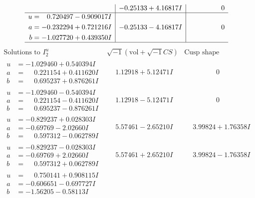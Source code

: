 \documentclass[1p]{elsarticle_modified}
\theoremstyle{definition}
\newcommand{\I}{\sqrt{-1}}
\begin{document}
$$\begin{array}{c|c|c}
 & -0.25133 + 4.16817 I & \phantom{-0.000000 } 0 \\ \hline\begin{aligned}
u &= \phantom{-}0.720497 - 0.909017 I \\
a &= -0.232294 + 0.721216 I \\
b &= -1.027720 + 0.439350 I\end{aligned}
 & -0.25133 - 4.16817 I & \phantom{-0.000000 } 0\\
 \hline 
 \end{array}$$\newpage$$\begin{array}{c|c|c}  
\text{Solutions to }I^u_{2}& \I (\text{vol} + \sqrt{-1}CS) & \text{Cusp shape}\\
 \hline 
\begin{aligned}
u &= -1.029460 + 0.540394 I \\
a &= \phantom{-}0.221154 + 0.411620 I \\
b &= \phantom{-}0.695237 + 0.876261 I\end{aligned}
 & \phantom{-}1.12918 + 5.12471 I & \phantom{-0.000000 } 0 \\ \hline\begin{aligned}
u &= -1.029460 - 0.540394 I \\
a &= \phantom{-}0.221154 - 0.411620 I \\
b &= \phantom{-}0.695237 - 0.876261 I\end{aligned}
 & \phantom{-}1.12918 - 5.12471 I & \phantom{-0.000000 } 0 \\ \hline\begin{aligned}
u &= -0.829237 + 0.028303 I \\
a &= -0.69769 - 2.02660 I \\
b &= \phantom{-}0.597312 - 0.062789 I\end{aligned}
 & \phantom{-}5.57461 - 2.65210 I & \phantom{-}3.99824 + 1.76358 I \\ \hline\begin{aligned}
u &= -0.829237 - 0.028303 I \\
a &= -0.69769 + 2.02660 I \\
b &= \phantom{-}0.597312 + 0.062789 I\end{aligned}
 & \phantom{-}5.57461 + 2.65210 I & \phantom{-}3.99824 - 1.76358 I \\ \hline\begin{aligned}
u &= \phantom{-}0.750141 + 0.908115 I \\
a &= -0.606651 - 0.697727 I \\
b &= -1.56205 - 0.58113 I\end{aligned}

\end{array}$$
\end{document}

